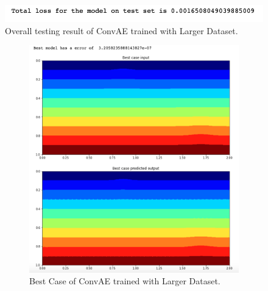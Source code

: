 \begin{figure}[H]
    \caption{Overall testing result of ConvAE trained with Larger Dataset.}
    \includegraphics[scale=0.8]{figures/mantle_convection_images/larger_dataset/ConvAE_OverallTesting.png}
\end{figure}

\begin{figure}[H]
\centering
\begin{subfigure}{0.45\textwidth}
    \includegraphics[width=\textwidth]{figures/mantle_convection_images/larger_dataset/ConvAE_Best.png}
    \caption{Best Case of ConvAE trained with Larger Dataset.}
\end{subfigure}
\hfill
\begin{subfigure}{0.45\textwidth}

\end{subfigure}
\end{figure}

